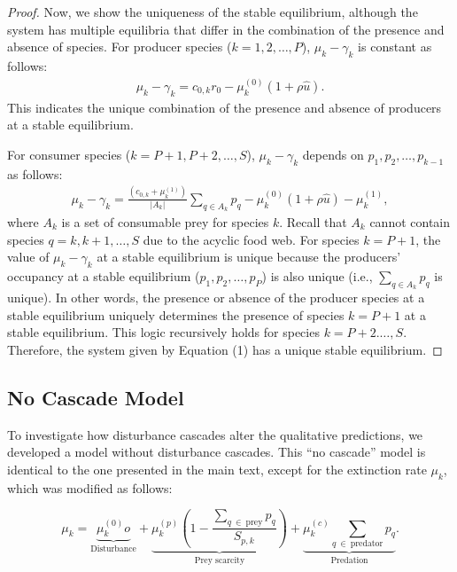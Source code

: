 \documentclass[11pt, class=article, crop=false]{standalone}
\begin{document}
\begin{proof}
Now, we show the uniqueness of the stable equilibrium, although the system has multiple equilibria that differ in the combination of the presence and absence of species.
For producer species ($k=1,2,\ldots, P$), $\mu_k-\gamma_k$ is constant as follows:
\begin{align}
    \mu_k-\gamma_k = c_{0, k}
r_0 - \mu_{k}^{(0)} (1 + \rho \hat{u}).
\end{align}
This indicates the unique combination of the presence and absence of producers at a stable equilibrium.

For consumer species ($k=P+1,P+2,\ldots, S$), $\mu_k-\gamma_k$ depends on $p_1, p_2, \ldots, p_{k-1}$ as follows:
\begin{align}
    \mu_k-\gamma_k = \frac{\left(c_{0, k}+\mu_{k}^{(1)}\right)}{|A_k|}\sum_{q \in A_k} p_q
- \mu_{k}^{(0)} (1 + \rho \hat{u})-\mu_{k}^{(1)} ,
\end{align}
where $A_k$ is a set of consumable prey for species $k$. Recall that $A_k$ cannot contain species $q=k, k+1, \ldots, S$ due to the acyclic food web. For species $k=P+1$, the value of $\mu_k-\gamma_k$ at a stable equilibrium is unique because the producers' occupancy at a stable equilibrium ($p_1, p_2, \ldots, p_P$) is also unique (i.e., $\sum_{q \in A_k} p_q$ is unique). In other words, the presence or absence of the producer species at a stable equilibrium uniquely determines the presence of species $k=P+1$ at a stable equilibrium. This logic recursively holds for species $k=P+2. \ldots, S$. Therefore, the system given by Equation (1) has a unique stable equilibrium.
\end{proof}
\subsection{No Cascade Model}

To investigate how disturbance cascades alter the qualitative predictions, we developed a model without disturbance cascades.
This ``no cascade'' model is identical to the one presented in the main text, except for the extinction rate $\mu_k$, which was modified as follows:

\begin{equation}
    \mu_{k} = 
        \underbrace{\mu_{k}^{(0)} o}_{\text{Disturbance}} + 
        \underbrace{\mu_{k}^{(p)} \left(1 - \frac{\sum_{q~\in~\text{prey}} p_{q}}{S_{p, k}} \right)}_{\text{Prey scarcity}} + 
        \underbrace{\mu_{k}^{(c)} \sum_{q~\in~\text{predator}} p_{q}}_{\text{Predation}}.
    \label{eq:extn}    
\end{equation}
\end{document}
